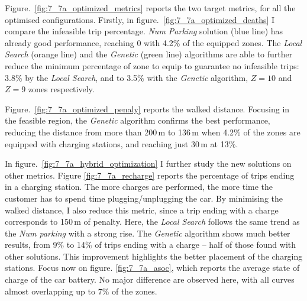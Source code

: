 Figure.~\ref{fig:7_7a_optimized_metrics} reports the two target metrics, for all the optimised configurations.
Firstly, in figure.~\ref{fig:7_7a_optimized_deaths} I compare the infeasible trip percentage. \textit{Num Parking} solution (blue line) has already good performance, reaching 0 with 4.2\% of the equipped zones. 
The \textit{Local Search} (orange line) and the \textit{Genetic} (green line) algorithms are able to further reduce the minimum percentage of zone to equip to guarantee no infeasible trips: 3.8\% by the \textit{Local Search}, and to 3.5\% with the \textit{Genetic} algorithm, $Z=10$ and $Z=9$ zones respectively.


Figure.~\ref{fig:7_7a_optimized_penaly} reports the walked distance. Focusing in the feasible region, the \textit{Genetic} algorithm confirms the best performance, reducing the distance from more than 200\,m to 136\,m when 4.2\% of the zones are equipped with charging stations, and reaching just 30\,m at 13\%. 


In figure.~\ref{fig:7_7a_hybrid_optimization} I further study the new solutions on other metrics.
Figure \ref{fig:7_7a_recharge} reports the percentage of trips ending in a charging station. The more charges are performed, the more time the customer has to spend time plugging/unplugging the car. By minimising the walked distance, I also reduce this metric, since a trip ending with a charge corresponds to 150\,m of penalty.
Here, the \textit{Local Search} follows the same trend as the \textit{Num parking} with a strong rise. The \textit{Genetic} algorithm shows much better results, from 9\% to 14\% of trips ending with a charge -- half of those found with other solutions. 
This improvement highlights the better placement of the charging stations.
Focus now on figure. \ref{fig:7_7a_asoc}, which reports the average state of charge of the car battery. 
No major difference are observed here, with all curves almost overlapping up to 7\% of the zones.

